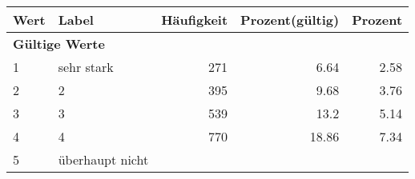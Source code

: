      \begin{longtable}{lXrrr}
     \toprule
     \textbf{Wert} & \textbf{Label} & \textbf{Häufigkeit} & \textbf{Prozent(gültig)} & \textbf{Prozent} \\
     \endhead
     \midrule
     \multicolumn{5}{l}{\textbf{Gültige Werte}}\\

     1 &
     \multicolumn{1}{X}{ sehr stark   } &


       \num{271} &
       \num[round-mode=places,round-precision=2]{6,64} &
         \num[round-mode=places,round-precision=2]{2,58} \\

     2 &
     \multicolumn{1}{X}{ 2   } &


       \num{395} &
       \num[round-mode=places,round-precision=2]{9,68} &
         \num[round-mode=places,round-precision=2]{3,76} \\

     3 &
     \multicolumn{1}{X}{ 3   } &


       \num{539} &
       \num[round-mode=places,round-precision=2]{13,2} &
         \num[round-mode=places,round-precision=2]{5,14} \\

     4 &
     \multicolumn{1}{X}{ 4   } &


       \num{770} &
       \num[round-mode=places,round-precision=2]{18,86} &
         \num[round-mode=places,round-precision=2]{7,34} \\

     5 &
     \multicolumn{1}{X}{ überhaupt nicht   } &



\end{longtable}
